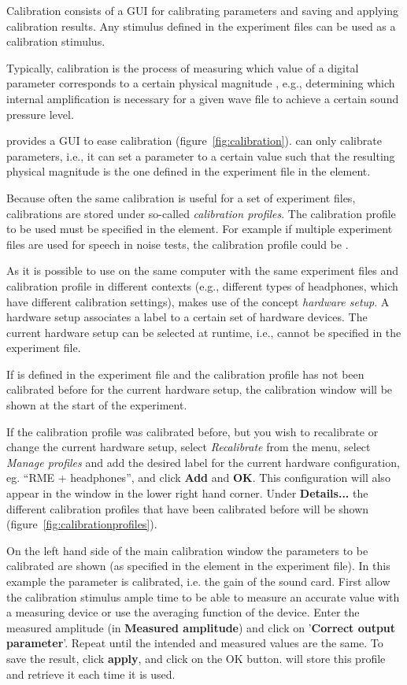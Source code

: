 Calibration consists of a GUI for calibrating parameters and saving and applying
calibration results. Any stimulus defined in the experiment files can be used as a calibration stimulus.

Typically, calibration is the process of measuring which value of
a digital parameter corresponds to a certain physical magnitude ,
e.g., determining which internal amplification is necessary for a
given wave file to achieve a certain sound pressure level.

\apex provides a GUI to ease calibration (figure~\ref{fig:calibration}).
\apex can only calibrate parameters, i.e., it can set a parameter
to a certain value such that the resulting physical magnitude is
the one defined in the experiment file in the
 element.

Because often the same calibration is useful for a set of
experiment files, calibrations are stored under so-called
\emph{calibration profiles}. The calibration profile to be used
must be specified in the  element. For
example if multiple experiment files are used for speech in noise
tests, the calibration profile could be .

As it is possible to use \apex on the same computer with the same
experiment files and calibration profile in different contexts (e.g., different types of
headphones, which have different calibration settings), \apex
makes use of the concept \emph{hardware setup}. A hardware setup
associates a label to a certain set of hardware devices. The
current hardware setup can be selected at runtime, i.e., cannot be
specified in the experiment file.

If  is defined in the experiment file and the
calibration profile has not been calibrated before for the current
hardware setup, the calibration window will be shown at the start
of the experiment. 


If the calibration profile was calibrated before, but you wish to
recalibrate or change the current hardware setup, select
\emph{Recalibrate} from the menu, select \emph{Manage profiles}
and add the desired label for the current hardware configuration,
eg. ``RME + headphones'', and click \textbf{Add} and \textbf{OK}.
This configuration will also appear in the \apex window in the
lower right hand corner. Under \textbf{Details...} the different
calibration profiles that have been calibrated before will be
shown (figure~\ref{fig:calibrationprofiles}).

On the left hand side of the main calibration window the
parameters to be calibrated are shown (as specified in the
 element in the experiment file). In this
example the parameter  is calibrated, i.e. the gain
of the sound card. First allow the calibration stimulus ample time
to be able to measure an accurate value with a measuring device or
use the averaging function of the device. Enter the measured
amplitude (in \textbf{Measured amplitude}) and click on
'\textbf{Correct output parameter}'. Repeat until the intended and
measured values are the same. To save the result, click
\textbf{apply}, and click on the OK button.  \apex will store this
profile and retrieve it each time it is used.


